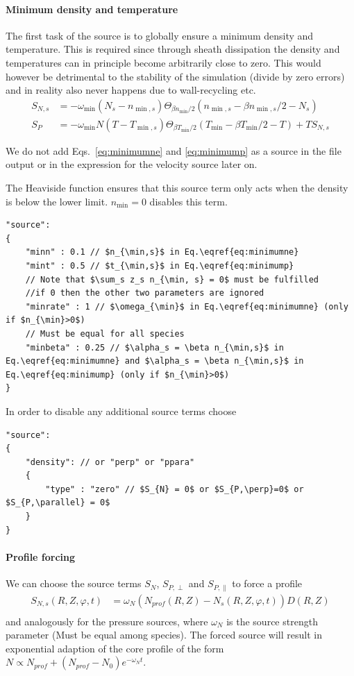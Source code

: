 \paragraph{Minimum density and temperature}
The first task of the source is to globally ensure a minimum density and temperature. This
is required since through sheath dissipation the density and temperatures can in
principle become arbitrarily close to zero. This would however
be detrimental to the stability of the simulation (divide by zero errors) and in reality
also never happens due to wall-recycling etc.
\begin{align}
    S_{N,s} &= - \omega_{\min} ( N_s - n_{\min,s}) \Theta_{\beta n_{\min}/2} (n_{\min,s} - \beta n_{\min,s} / 2 - N_s)
    \label{eq:minimumne}
    \\
    S_{P} &= -\omega_{\min} N( T - T_{\min,s}) \Theta_{\beta T_{\min}/2}( T_{\min} - \beta T_{\min}/2 - T) + TS_{N,s}
    \label{eq:minimump}
\end{align}
\begin{tcolorbox}[title=Note]
    We do not add Eqs.~\eqref{eq:minimumne} and \eqref{eq:minimump} as a source
    in the file output or in the expression for the velocity source later on.
\end{tcolorbox}
The Heaviside function ensures that this source term only acts when the density
is below the lower limit. $n_{\min}=0$ disables this term.
\begin{verbatim}
"source":
{
    "minn" : 0.1 // $n_{\min,s}$ in Eq.\eqref{eq:minimumne}
    "mint" : 0.5 // $t_{\min,s}$ in Eq.\eqref{eq:minimump}
    // Note that $\sum_s z_s n_{\min, s} = 0$ must be fulfilled
    //if 0 then the other two parameters are ignored
    "minrate" : 1 // $\omega_{\min}$ in Eq.\eqref{eq:minimumne} (only if $n_{\min}>0$)
    // Must be equal for all species
    "minbeta" : 0.25 // $\alpha_s = \beta n_{\min,s}$ in Eq.\eqref{eq:minimumne} and $\alpha_s = \beta n_{\min,s}$ in Eq.\eqref{eq:minimump} (only if $n_{\min}>0$)
}
\end{verbatim}
\noindent
In order to disable any additional source terms choose
\begin{verbatim}
"source":
{
    "density": // or "perp" or "ppara"
    {
        "type" : "zero" // $S_{N} = 0$ or $S_{P,\perp}=0$ or $S_{P,\parallel} = 0$
    }
}
\end{verbatim}

\paragraph{Profile forcing}
\noindent We can choose the source terms $S_N$, $S_{P,\perp}$ and $S_{P,\parallel}$ to force a profile
\begin{align} \label{eq:electron_source}
    S_{N,s}(R,Z,\varphi, t) &= \omega_N (N_{prof}(R,Z) - N_s(R,Z,\varphi, t))D(R,Z) \\
\end{align}
and analogously for the pressure sources,
where $\omega_N$ is the source strength parameter (Must be equal among species).
The forced source will result in exponential adaption of the core
profile of the form $N \propto N_{prof}+(N_{prof}-N_{0})e^{-\omega_Nt}$.

